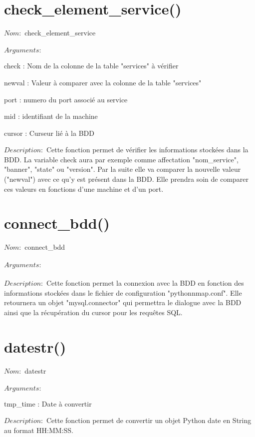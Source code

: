\documentclass[12pt]{report}
\begin{document}
		\section{check\_element\_service()}
			{\setlength{\parindent}{0cm}
			$Nom :$ check\_element\_service\\\\
			}
			$Arguments :$
			\begin{description}
				\item check : Nom de la colonne de la table "services" à vérifier
				\item newval : Valeur à comparer avec la colonne de la table "services"
				\item port : numero du port associé au service
				\item mid : identifiant de la machine
				\item cursor : Curseur lié à la BDD\\
			\end{description}
			$Description : $ Cette fonction permet de vérifier les informations stockées dans la BDD. La variable check aura par exemple comme affectation "nom\_service", "banner", "state" ou "version". Par la suite elle va comparer la nouvelle valeur ("newval") avec ce qu'y est présent dans la BDD.  Elle prendra soin de comparer ces valeurs en fonctions d'une machine et d'un port.
		\section{connect\_bdd()}
			{\setlength{\parindent}{0cm}
			$Nom :$ connect\_bdd\\\\
			}
			$Arguments :$\\\\
			$Description : $ Cette fonction permet la connexion avec la BDD en fonction des informations stockées dans le fichier de configuration "pythonnmap.conf". Elle retournera un objet "mysql.connector" qui permettra le dialogue avec la BDD ainsi que la récupération du cursor pour les requêtes SQL.
		\section{datestr()}
			{\setlength{\parindent}{0cm}
			$Nom :$ datestr\\\\
			}
			$Arguments :$
			\begin{description}
				\item tmp\_time : Date à convertir\\
			\end{description}
			$Description : $ Cette fonction permet de convertir un objet Python date en String au format HH:MM:SS.
\end{document}
